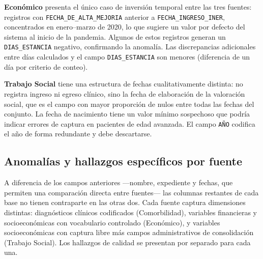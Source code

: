 \textbf{Económico} presenta el único caso de inversión temporal entre las tres fuentes: registros con \texttt{FECHA\_DE\_ALTA\_MEJORIA} anterior a \texttt{FECHA\_INGRESO\_INER}, concentrados en enero--marzo de 2020, lo que sugiere un valor por defecto del sistema al inicio de la pandemia. Algunos de estos registros generan un \texttt{DIAS\_ESTANCIA} negativo, confirmando la anomalía. Las discrepancias adicionales entre días calculados y el campo \texttt{DIAS\_ESTANCIA} son menores (diferencia de un día por criterio de conteo).

\textbf{Trabajo Social} tiene una estructura de fechas cualitativamente distinta: no registra ingreso ni egreso clínico, sino la fecha de elaboración de la valoración social, que es el campo con mayor proporción de nulos entre todas las fechas del conjunto. La fecha de nacimiento tiene un valor mínimo sospechoso que podría indicar errores de captura en pacientes de edad avanzada. El campo \texttt{AÑO} codifica el año de forma redundante y debe descartarse.

\subsection{Anomalías y hallazgos específicos por fuente}

A diferencia de los campos anteriores ---nombre, expediente y fechas, que permiten una comparación directa entre fuentes--- las columnas restantes de cada base no tienen contraparte en las otras dos. Cada fuente captura dimensiones distintas: diagnósticos clínicos codificados (Comorbilidad), variables financieras y socioeconómicas con vocabulario controlado (Económico), y variables socioeconómicas con captura libre más campos administrativos de consolidación (Trabajo Social). Los hallazgos de calidad se presentan por separado para cada una.

